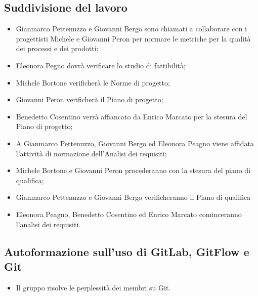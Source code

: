 \documentclass[11pt,a4paper]{article}
\begin{document}
	\subsection{Suddivisione del lavoro}
	\begin{itemize}
		\item Gianmarco Pettenuzzo e Giovanni Bergo sono chiamati a collaborare con i progettisti Michele e Giovanni Peron per normare le metriche per la qualità dei processi e dei prodotti;
		\item Eleonora Pegno dovrà verificare lo studio di fattibilità;
		\item Michele Bortone verificherà le Norme di progetto;
		\item Giovanni Peron verificherà il Piano di progetto;
		\item Benedetto Cosentino verrà affiancato da Enrico Marcato per la stesura del Piano di progetto;
		\item A Gianmarco Pettenuzzo, Giovanni Bergo ed Eleonora Peagno viene affidata l'attività di normazione dell'Analisi dei requisiti;
		\item Michele Bortone e Giovanni Peron procederanno con la stesura del piano di qualifica;
		\item Gianmarco Pettenuzzo  e Giovanni Bergo verificheranno il Piano di qualifica
		\item Eleonora Peagno, Benedetto Cosentino ed Enrico Marcato cominceranno l'analisi dei requisiti.
	\end{itemize}
	\subsection{Autoformazione sull'uso di GitLab, GitFlow e Git}
	\begin{itemize}
	\item Il gruppo risolve le perplessità dei membri su Git.
	\end{itemize}
\end{document}
